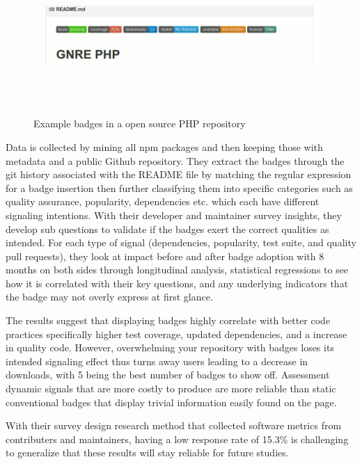 \documentclass[12pt]{article}
\begin{document}
\begin{figure}
    \centering
    \includegraphics[width=\textwidth,height=6cm,keepaspectratio=true]{gnrephpbadges}
    \caption{
        Example badges in a open source PHP repository \protect\cite{badgeimage}
    }
    \label{phpbadge}
\end{figure}

Data is collected by mining all npm \cite{npm} packages and then keeping those with metadata and a public Github \cite{github} repository. 
They extract the badges through the git history associated with 
the README file by matching the regular expression for a badge insertion then further classifying them into specific categories
such as quality assurance, popularity, dependencies etc. which each have different signaling intentions.
With their developer and maintainer survey insights, they develop sub questions to validate if the badges exert the correct qualities as intended. 
For each type of signal (dependencies, popularity, test suite, and quality pull requests), they look at 
impact before and after badge adoption with 8 months on both sides through longitudinal analysis, statistical regressions
to see how it is correlated with their key questions, and any underlying indicators that the badge may not overly express at first glance.

The results suggest that displaying badges highly correlate with better code practices specifically higher test coverage, updated dependencies, and a increase in quality code.
However, overwhelming your repository with badges loses its intended signaling effect thus turns away users leading to a decrease in downloads,
with 5 being the best number of badges to show off.
Assessment dynamic signals that are more costly to produce are more reliable than static conventional badges 
that display trivial information easily found on the page.

With their survey design research method that collected software metrics from contributers and maintainers, having a low response rate of 15.3\% 
is challenging to generalize that these results will stay reliable for future studies.
\end{document}
